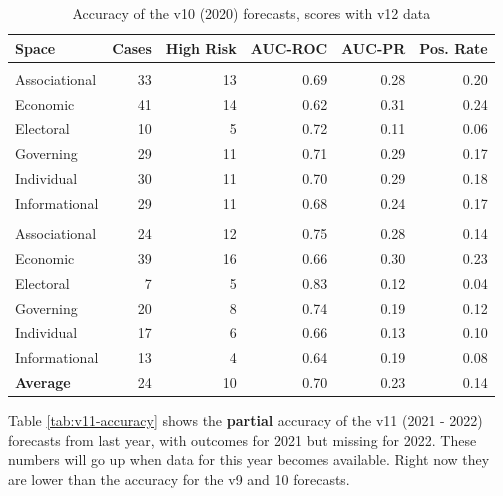 \documentclass[
  11pt,
]{article}
\begin{document}
\begin{table}

\caption{\label{tab:v10-accuracy}Accuracy of the v10 (2020) forecasts, scores with v12 data}
\centering
\begin{tabular}[t]{lrrrrr}
\toprule
Space & Cases & High Risk & AUC-ROC & AUC-PR & Pos. Rate\\
\midrule
\addlinespace[0.3em]
\multicolumn{6}{l}{\textbf{Closing}}\\
\hspace{1em}Associational & 33 & 13 & 0.69 & 0.28 & 0.20\\
\hspace{1em}Economic & 41 & 14 & 0.62 & 0.31 & 0.24\\
\hspace{1em}Electoral & 10 & 5 & 0.72 & 0.11 & 0.06\\
\hspace{1em}Governing & 29 & 11 & 0.71 & 0.29 & 0.17\\
\hspace{1em}Individual & 30 & 11 & 0.70 & 0.29 & 0.18\\
\hspace{1em}Informational & 29 & 11 & 0.68 & 0.24 & 0.17\\
\addlinespace[0.3em]
\multicolumn{6}{l}{\textbf{Opening}}\\
\hspace{1em}Associational & 24 & 12 & 0.75 & 0.28 & 0.14\\
\hspace{1em}Economic & 39 & 16 & 0.66 & 0.30 & 0.23\\
\hspace{1em}Electoral & 7 & 5 & 0.83 & 0.12 & 0.04\\
\hspace{1em}Governing & 20 & 8 & 0.74 & 0.19 & 0.12\\
\hspace{1em}Individual & 17 & 6 & 0.66 & 0.13 & 0.10\\
\hspace{1em}Informational & 13 & 4 & 0.64 & 0.19 & 0.08\\
\addlinespace[0.3em]
\textbf{Average} & 24 & 10 & 0.70 & 0.23 & 0.14\\
\bottomrule
\end{tabular}
\end{table}

Table \ref{tab:v11-accuracy} shows the \textbf{partial} accuracy of the
v11 (2021 - 2022) forecasts from last year, with outcomes for 2021 but
missing for 2022. These numbers will go up when data for this year
becomes available. Right now they are lower than the accuracy for the v9
and 10 forecasts.
\end{document}
